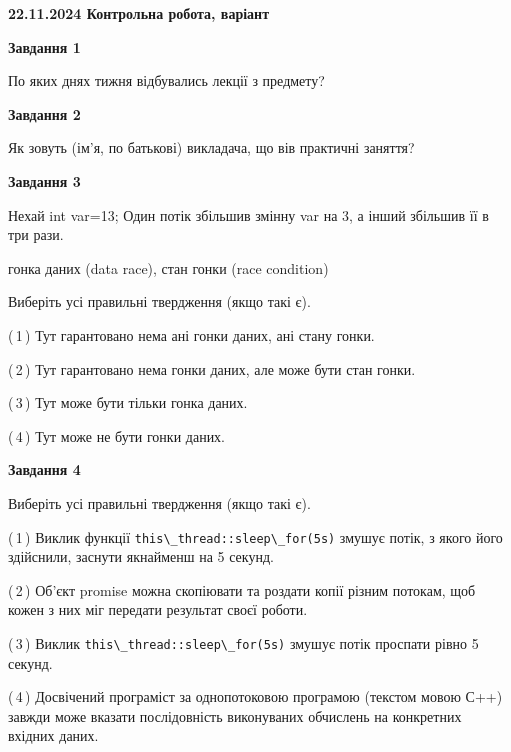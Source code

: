 \documentclass[12pt, ukrainian]{article}
\def\code#1{\Verb!#1!}
\begin{document}
\begin {large}

\textbf{22.11.2024 Контрольна робота, варіант  }\par


{

\begin{center}
\textbf{Завдання 1}
\end{center}

По яких днях тижня відбувались лекції з предмету?


\begin{center}
\textbf{Завдання 2}
\end{center}

Як зовуть (ім'я, по батькові) викладача, що вів практичні заняття?


\begin{center}
\textbf{Завдання 3}
\end{center}

Нехай int var=13; Один потік збільшив змінну var на 3, а інший збільшив її в три рази.

гонка даних (data race), стан гонки (race condition)

Виберіть усі правильні твердження (якщо такі є).\par
\vspace{2mm}
(\,1\,) Тут гарантовано нема ані гонки даних, ані стану гонки.%

(\,2\,) Тут гарантовано нема гонки даних, але може бути стан гонки.%

(\,3\,) Тут може бути тільки гонка даних.%

(\,4\,) Тут може не бути гонки даних.%


\begin{center}
\textbf{Завдання 4}
\end{center}

Виберіть усі правильні твердження (якщо такі є).\par
\vspace{2mm}

(\,1\,) Виклик функції \code{this\_thread::sleep\_for(5s)} змушує потік, з якого його здійснили, заснути якнайменш на 5 секунд.%

(\,2\,) Об’єкт promise можна скопіювати та роздати копії різним потокам, щоб кожен з них міг передати результат своєї роботи.%

(\,3\,) Виклик \code{this\_thread::sleep\_for(5s)} змушує потік проспати рівно 5 секунд.%

(\,4\,) Досвічений програміст за однопотоковою програмою (текстом мовою С++) завжди може вказати послідовність виконуваних обчислень на конкретних вхідних даних.%


}
\end{large}
\end{document}
